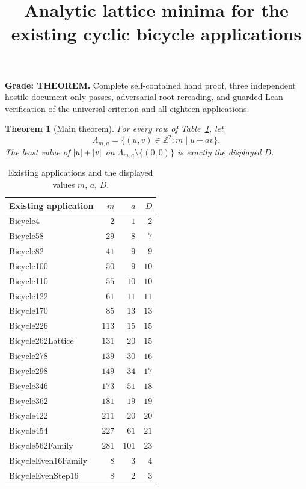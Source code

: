 \documentclass{article}
\title{Analytic lattice minima for the existing cyclic bicycle applications}
\author{}
\date{}
\newtheorem{theorem}{Theorem}
\DeclarePairedDelimiter{\abs}{\lvert}{\rvert}
\begin{document}
\maketitle

\textbf{Grade: THEOREM.} Complete self-contained hand proof, three independent
hostile document-only passes, adversarial root rereading, and guarded Lean
verification of the universal criterion and all eighteen applications.

\begin{theorem}[Main theorem]\label{thm:main}
  For every row of Table~\ref{tab:main}, let
  \begin{equation}\label{eq:lattice}
    \Lambda_{m,a}=\{(u,v)\in\mathbb{Z}^2:m\mid u+av\}.
  \end{equation}
  The least value of \(\abs{u}+\abs{v}\) on \(\Lambda_{m,a}\setminus\{(0,0)\}\) is
  exactly the displayed \(D\).
\end{theorem}

\begin{table}[htbp]
  \centering
  \caption{Existing applications and the displayed values \(m\), \(a\), \(D\).}
  \label{tab:main}
  \begin{tabular}{lrrr}
    Existing application & \(m\) & \(a\) & \(D\) \\
    \hline
    Bicycle4 & \(2\) & \(1\) & \(2\) \\
    Bicycle58 & \(29\) & \(8\) & \(7\) \\
    Bicycle82 & \(41\) & \(9\) & \(9\) \\
    Bicycle100 & \(50\) & \(9\) & \(10\) \\
    Bicycle110 & \(55\) & \(10\) & \(10\) \\
    Bicycle122 & \(61\) & \(11\) & \(11\) \\
    Bicycle170 & \(85\) & \(13\) & \(13\) \\
    Bicycle226 & \(113\) & \(15\) & \(15\) \\
    Bicycle262Lattice & \(131\) & \(20\) & \(15\) \\
    Bicycle278 & \(139\) & \(30\) & \(16\) \\
    Bicycle298 & \(149\) & \(34\) & \(17\) \\
    Bicycle346 & \(173\) & \(51\) & \(18\) \\
    Bicycle362 & \(181\) & \(19\) & \(19\) \\
    Bicycle422 & \(211\) & \(20\) & \(20\) \\
    Bicycle454 & \(227\) & \(61\) & \(21\) \\
    Bicycle562Family & \(281\) & \(101\) & \(23\) \\
    BicycleEven16Family & \(8\) & \(3\) & \(4\) \\
    BicycleEvenStep16 & \(8\) & \(2\) & \(3\) \\
  \end{tabular}
\end{table}
\end{document}
